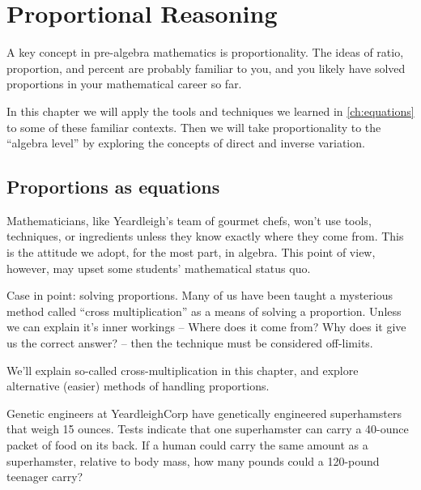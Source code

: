 \chapter{Proportional Reasoning}
\label{ch:proportions}


A key concept in pre-algebra mathematics is proportionality. The ideas of ratio, proportion, and percent are probably familiar to you, and you likely have solved proportions in your mathematical career so far.

In this chapter we will apply the tools and techniques we learned in \cref{ch:equations} to some of these familiar contexts. Then we will take proportionality to the ``algebra level'' by exploring the concepts of direct and inverse variation.

\section{Proportions as equations}
\label{sec:propsaseqs}

Mathematicians, like Yeardleigh's team of gourmet chefs, won't use tools, techniques, or ingredients unless they know exactly where they come from. This is the attitude we adopt, for the most part, in algebra. This point of view, however, may upset some students' mathematical status quo.

Case in point: solving proportions. Many of us have been taught a mysterious method called ``cross multiplication'' as a means of solving a proportion. Unless we can explain it's inner workings -- Where does it come from? Why does it give us the correct answer? -- then the technique must be considered off-limits.

We'll explain so-called cross-multiplication in this chapter, and explore alternative (easier) methods of handling proportions.


\begin{boxedexplore}
Genetic engineers at YeardleighCorp have genetically engineered superhamsters that weigh 15 ounces. Tests indicate that one superhamster can carry a 40-ounce packet of food on its back. If a human could carry the same amount as a superhamster, relative to body mass, how many pounds could a 120-pound teenager carry?
\end{boxedexplore}

